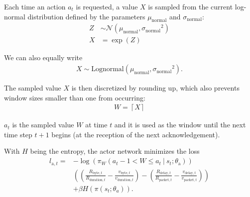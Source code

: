 \documentclass[sigconf]{acmart}
\newcommand\givenbase[1][]{\:#1\lvert\:}
\let\given\givenbase
\begin{document}
Each time an action $a_t$ is requested, a value $X$ is sampled from the current log-normal distribution defined by the parameters $\mu_\text{normal}$ and $\sigma_\text{normal}$: 
\begin{align*}
Z&\sim {\mathcal {N}}(\mu_\text{normal} ,{\sigma_{\text{normal}}}^{2})\\
X&=\exp(Z)
\end{align*}

We can also equally write
\begin{align*}
X \sim \text{Lognormal}\left( \mu_\text{normal}, {\sigma_{\text{normal}}}^{2}\right).
\end{align*}

The sampled value $X$ is then discretized by rounding up, which also prevents window sizes smaller than one from occurring:
\begin{align*}
W = \left\lceil X \right\rceil
\end{align*}

$a_t$ is the sampled value $W$ at time $t$ and it is used as the window until the next time step $t+1$ begins (at the reception of the next acknowledgement). 


With $H$ being the entropy, the actor network minimizes the loss
\begin{align*}
l_{\text{a},t} =& -\log \left( \pi_W\left( a_t-1 < W \leq a_t \given s_t; \theta_\text{a} \right)\right)\\
&\left( \left(\frac{R_{\text{byte},t}}{{R_{\text{duration},t}}} - \frac{v_{\text{byte},t}}{{v_{\text{duration},t}}}\right) - \left( \frac{R_{\text{delay},t}}{{R_{\text{packet},t}}}- \frac{v_{\text{delay},t}}{{v_{\text{packet},t}}} \right)\right)\\ 
&+ \beta H\left( \pi\left( s_t; \theta_a \right)\right).
\end{align*}
 


\end{document}
